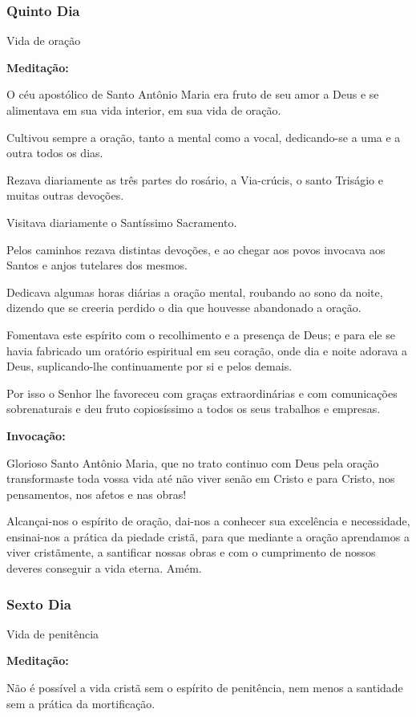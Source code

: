 \documentclass[a4paper,14pt]{extarticle} \usepackage[utf8]{inputenc}
\begin{document}
\subsubsection{Quinto Dia}
Vida de oração

\textbf{Meditação:}

O céu apostólico de Santo Antônio Maria era fruto de seu amor a Deus e se alimentava em sua vida interior, em sua vida de oração.

Cultivou sempre a oração, tanto a mental como a vocal, dedicando-se a uma e a outra todos os dias.

Rezava diariamente as três partes do rosário, a Via-crúcis, o santo Triságio e muitas outras devoções.

Visitava diariamente o Santíssimo Sacramento.

Pelos caminhos rezava distintas devoções, e ao chegar aos povos invocava aos Santos e anjos tutelares dos mesmos.

Dedicava algumas horas diárias a oração mental, roubando ao sono da noite, dizendo que se creeria perdido o dia que houvesse abandonado a oração.

Fomentava este espírito com o recolhimento e a presença de Deus; e para ele se havia fabricado um oratório espiritual em seu coração, onde dia e noite adorava a Deus, suplicando-lhe continuamente por si e pelos demais.

Por isso o Senhor lhe favoreceu com graças extraordinárias e com comunicações sobrenaturais e deu fruto copiosíssimo a todos os seus trabalhos e empresas.

\textbf{Invocação:}

Glorioso Santo Antônio Maria, que no trato continuo com Deus pela oração transformaste toda vossa vida até não viver senão em Cristo e para Cristo, nos pensamentos, nos afetos e nas obras!

Alcançai-nos o espírito de oração, dai-nos a conhecer sua excelência e necessidade, ensinai-nos a prática da piedade cristã, para que mediante a oração aprendamos a viver cristãmente, a santificar nossas obras e com o cumprimento de nossos deveres conseguir a vida eterna. Amém.

\subsubsection{Sexto Dia}
Vida de penitência

\textbf{Meditação:}

Não é possível a vida cristã sem o espírito de penitência, nem menos a santidade sem a prática da mortificação.
\end{document}
